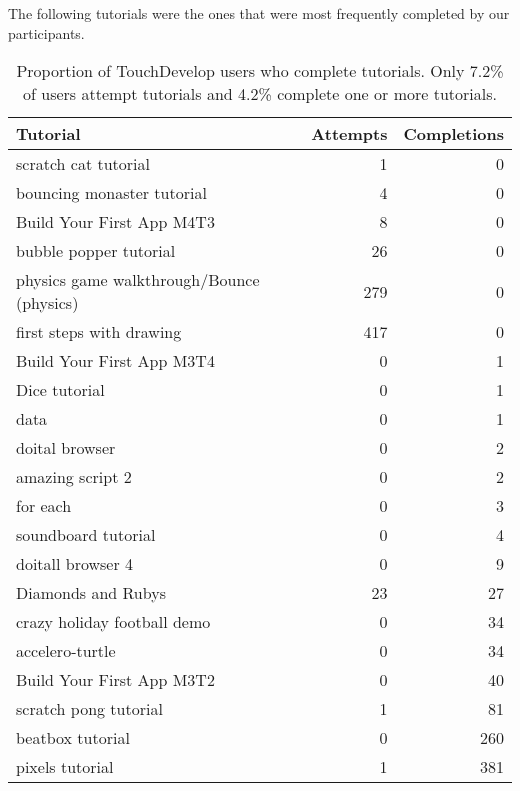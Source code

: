 The following tutorials were the ones that were most frequently completed by our participants.



\begin{table}
	\centering
	\begin{tabular}{lrr}
		\toprule
		Tutorial & Attempts & Completions\\\midrule
		scratch cat tutorial &	1 & 0 \\
		bouncing monaster tutorial &	4 & 0 \\
		Build Your First App M4T3 &	8 &	0\\
		bubble popper tutorial & 26 & 0 \\
		physics game walkthrough/Bounce (physics) &	279 & 0 \\
		first steps with drawing & 417 & 0 \\
		Build Your First App M3T4 & 0 & 1\\
		Dice tutorial &	0 & 1\\
		data & 0 & 1\\
		doital browser & 0 & 2\\
		amazing script 2 & 0 & 2\\
		for each & 0 & 3\\
		soundboard tutorial & 0 & 4\\
		doitall browser 4 &	0 &	9\\
		Diamonds and Rubys &	23 &	27\\
		crazy holiday football demo &	0 &	34\\
		accelero-turtle &	0 &	34\\
		Build Your First App M3T2 & 0 &	40\\
		scratch pong tutorial &	1 &	81\\
		beatbox tutorial &	0 &	260\\
		pixels tutorial &	1 &	381\\
		\bottomrule
	\end{tabular}
	\caption{Proportion of TouchDevelop users who complete tutorials. Only 7.2\% of users attempt tutorials and 4.2\% complete one or more tutorials.}
	\label{tab:tutorial_completions}
\end{table}

